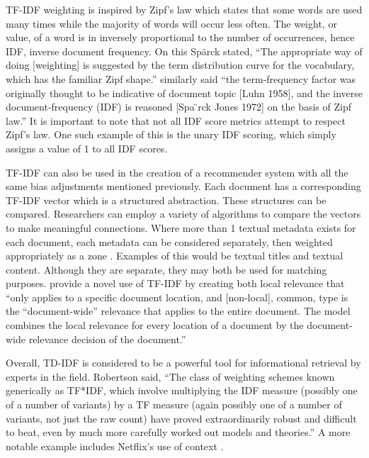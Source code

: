 TF-IDF weighting is inspired by Zipf's law which states that some words are used many times while the majority of words will occur less often. The weight, or value, of a word is in inversely proportional to the number of occurrences, hence IDF, inverse document frequency. On this Sp\"{a}rck stated, ``The appropriate way of doing [weighting] is suggested by the term distribution curve for the vocabulary, which has the familiar Zipf shape.'' \citep{Wu:2008:Interpreting_tf_idf_term_weights} similarly said ``the term-frequency factor was originally thought to be indicative of document topic [Luhn 1958], and the inverse document-frequency (IDF) is reasoned [Spa ̈rck Jones 1972] on the basis of Zipf law.'' It is important to note that not all IDF score metrics attempt to respect Zipf's law. One such example of this is the unary IDF scoring, which simply assigns a value of 1 to all IDF scores.

TF-IDF can also be used in the creation of a recommender system with all the same bias adjustments mentioned previously. Each document has a corresponding TF-IDF vector which is a structured abstraction. These structures can be compared. Researchers can employ a variety of algorithms to compare the vectors to make meaningful connections. %
Where more than 1 textual metadata exists for each document, each metadata can be considered separately, then weighted appropriately as a zone \citep{manning_raghavan_2008_scoring}. Examples of this would be textual titles and textual content. Although they are separate, they may both be used for matching purposes. \citet{Wu:2008:Interpreting_tf_idf_term_weights} provide a novel use of TF-IDF by creating both local relevance that ``only applies to a specific document location, and [non-local], common, type is the ``document-wide'' relevance that applies to the entire document. The model combines the local relevance for every location of a document by the document-wide relevance decision of the document.''

Overall, TD-IDF is considered to be a powerful tool for informational retrieval by experts in the field. Robertson \citeyearpar{understanding_idf_2004} said, ``The class of weighting schemes known generically as TF*IDF, which involve multiplying the IDF measure (possibly one of a number of variants) by a TF measure (again possibly one of a number of variants, not just the raw count) have proved extraordinarily robust and difficult to beat, even by much more carefully worked out models and theories.'' A more notable example includes Netflix’s use of context \citep{Bell:2007:lessons_from_the_netflix_prize}.

